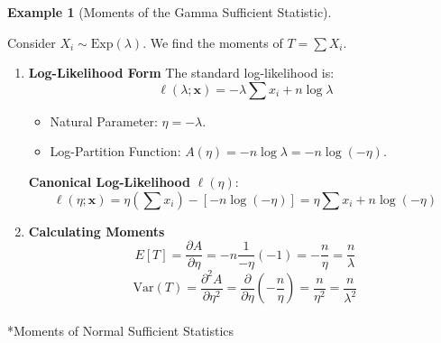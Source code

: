 \documentclass[
  letterpaper,
  DIV=11,
  numbers=noendperiod]{scrreprt}
\makeatletter
\let\oldparagraph\paragraph
\renewcommand{\paragraph}{
    \@ifstar
      \xxxParagraphStar
      \xxxParagraphNoStar
  }
\newcommand{\xxxParagraphStar}[1]{\oldparagraph*{#1}\mbox{}}
\newcommand{\xxxParagraphNoStar}[1]{\oldparagraph{#1}\mbox{}}
\providecommand{\tightlist}{%
  \setlength{\itemsep}{0pt}\setlength{\parskip}{0pt}}
\renewcommand{\[}{\begin{equation}}
\renewcommand{\]}{\end{equation}}
\theoremstyle{definition}
\theoremstyle{plain}
\theoremstyle{plain}
\theoremstyle{plain}
\theoremstyle{definition}
\newtheorem{example}{Example}[chapter]
\theoremstyle{plain}
\theoremstyle{remark}
\makeatother
\begin{document}
\begin{example}[Moments of the Gamma Sufficient
Statistic]\protect\hypertarget{exm-exponential-moments}{}\label{exm-exponential-moments}

Consider \(X_i \sim \text{Exp}(\lambda)\). We find the moments of
\(T = \sum X_i\).

\begin{enumerate}
\def\labelenumi{\arabic{enumi}.}
\item
  \textbf{Log-Likelihood Form} The standard log-likelihood is: \[
   \ell(\lambda; \mathbf{x}) = -\lambda \sum x_i + n \log \lambda
   \]

  \begin{itemize}
  \tightlist
  \item
    Natural Parameter: \(\eta = -\lambda\).
  \item
    Log-Partition Function:
    \(A(\eta) = -n \log \lambda = -n \log(-\eta)\).
  \end{itemize}

  \textbf{Canonical Log-Likelihood} \(\ell(\eta)\): \[
   \ell(\eta; \mathbf{x}) = \eta \left(\sum x_i\right) - \left[ -n \log(-\eta) \right] = \eta \sum x_i + n \log(-\eta)
   \]
\item
  \textbf{Calculating Moments} \[
   E[T] = \frac{\partial A}{\partial \eta} = -n \frac{1}{-\eta}(-1) = -\frac{n}{\eta} = \frac{n}{\lambda}
   \] \[
   \text{Var}(T) = \frac{\partial^2 A}{\partial \eta^2} = \frac{\partial}{\partial \eta} \left(-\frac{n}{\eta}\right) = \frac{n}{\eta^2} = \frac{n}{\lambda^2}
   \]
\end{enumerate}

\end{example}

\paragraph*{Moments of Normal Sufficient
Statistics}\label{moments-of-normal-sufficient-statistics}
\end{document}
